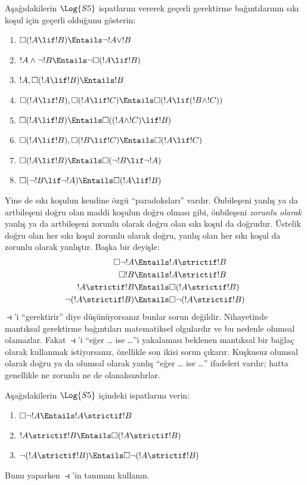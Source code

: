 \begin{prob}
  Aşağıdakilerin $\Log{S5}$ ispatlarını vererek geçerli gerektirme
  bağıntılarının sıkı koşul için geçerli olduğunu gösterin:
  \begin{enumerate}
  \item  $\Box(!A \lif !B) \Entails \lnot !A \lor !B$
  \item $!A \land \lnot !B \Entails \lnot\Box(!A \lif !B)$
  \item $!A, \Box(!A \lif !B) \Entails !B$
  \item $\Box(!A \lif !B), \Box(!A \lif !C) \Entails \Box(!A \lif (!B
    \land !C))$
  \item $\Box(!A \lif !B) \Entails \Box((!A \land !C) \lif !B)$
  \item $\Box(!A \lif !B), \Box(!B \lif !C) \Entails \Box(!A
    \lif !C)$
  \item $\Box(!A \lif !B) \Entails \Box(\lnot !B \lif \lnot !A)$
  \item $\Box(\lnot !B \lif \lnot !A) \Entails \Box(!A \lif !B)$
  \end{enumerate}
\end{prob}

Yine de sıkı koşulun kendine özgü ``paradoksları'' vardır. Önbileşeni yanlış
ya da artbileşeni doğru olan maddi koşulun doğru olması gibi, önbileşeni
\emph{zorunlu olarak} yanlış ya da artbileşeni zorunlu olarak doğru olan
sıkı koşul da doğrudur. Üstelik doğru olan her sıkı koşul zorunlu olarak
doğru, yanlış olan her sıkı koşul da zorunlu olarak yanlıştır. Başka bir
deyişle:
\begin{align}
  \Box \lnot !A & \Entails !A \strictif !B\\
  \Box !B & \Entails !A \strictif !B\\
  !A \strictif !B& \Entails \Box(!A \strictif !B)\\
  \lnot(!A \strictif !B) & \Entails \Box\lnot(!A \strictif !B)
\end{align}
$\strictif$'i ``gerektirir'' diye düşünüyorsanız bunlar sorun değildir.
Nihayetinde mantıksal gerektirme bağıntıları matematiksel olgulardır ve bu
nedenle olumsal olamazlar. Fakat $\strictif$'i ``eğer \dots{} ise \dots''i
yakalaması beklenen mantıksal bir bağlaç olarak kullanmak istiyorsanız,
özellikle son ikisi sorun çıkarır. Kuşkusuz olumsal olarak doğru ya da
olumsal olarak yanlış ``eğer \dots{} ise \dots'' ifadeleri vardır; hatta
genellikle ne zorunlu ne de olanaksızdırlar.

\begin{prob}
  Aşağıdakilerin $\Log{S5}$ içindeki ispatlarını verin:
  \begin{enumerate}
    \item  $\Box \lnot !A \Entails !A \strictif !B$
    \item $!A \strictif !B \Entails \Box(!A \strictif !B)$
    \item $\lnot(!A \strictif !B) \Entails \Box\lnot(!A \strictif !B)$
  \end{enumerate}
  Bunu yaparken $\strictif$'in tanımını kullanın.
\end{prob}

